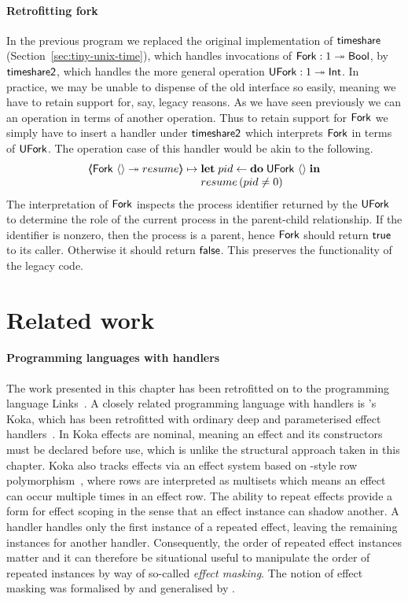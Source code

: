 \documentclass[12pt,phd,lfcs,twoside,openright,logo,leftchapter,normalheadings]{infthesis}
\theoremstyle{plain}
\theoremstyle{definition}
\begin{document}
\paragraph{Retrofitting fork} In the previous program we replaced the
original implementation of $\mathsf{timeshare}$
(Section~\ref{sec:tiny-unix-time}), which handles invocations of
$\mathsf{Fork} : 1 \twoheadrightarrow \mathsf{Bool}$, by $\mathsf{timeshare2}$, which handles the
more general operation $\mathsf{UFork} : 1 \twoheadrightarrow \mathsf{Int}$. In practice,
we may be unable to dispense of the old interface so easily, meaning
we have to retain support for, say, legacy reasons. As we have seen
previously we can an operation in terms of another operation. Thus to
retain support for $\mathsf{Fork}$ we simply have to insert a handler under
$\mathsf{timeshare2}$ which interprets $\mathsf{Fork}$ in terms of $\mathsf{UFork}$. The
operation case of this handler would be akin to the following.
%
\[
  \OpCase{\Fork}{\Unit}{resume} \mapsto
    \bl
      \Let\;pid \revto \Do\;\UFork~\Unit\;\In\\
      resume\,(pid \neq 0)
    \el
\]
%
The interpretation of $\mathsf{Fork}$ inspects the process identifier returned
by the $\mathsf{UFork}$ to determine the role of the current process in the
parent-child relationship. If the identifier is nonzero, then the
process is a parent, hence $\mathsf{Fork}$ should return $\mathsf{true}$ to its
caller. Otherwise it should return $\mathsf{false}$. This preserves the
functionality of the legacy code.

\section{Related work}
\label{sec:unix-related-work}

\paragraph{Programming languages with handlers} The work presented in
this chapter has been retrofitted on to the programming language
Links~\cite{HillerstromL16,HillerstromL18}. A closely related
programming language with handlers is \citeauthor{Leijen17}'s Koka,
which has been retrofitted with ordinary deep and parameterised effect
handlers~\cite{Leijen17}. In Koka effects are nominal, meaning an
effect and its constructors must be declared before use, which is
unlike the structural approach taken in this chapter. Koka also tracks
effects via an effect system based on \citeauthor{Leijen05}-style row
polymorphism~\cite{Leijen05,Leijen14}, where rows are interpreted as
multisets which means an effect can occur multiple times in an effect
row. The ability to repeat effects provide a form for effect scoping
in the sense that an effect instance can shadow another. A handler
handles only the first instance of a repeated effect, leaving the
remaining instances for another handler. Consequently, the order of
repeated effect instances matter and it can therefore be situational
useful to manipulate the order of repeated instances by way of
so-called \emph{effect masking}.
%
The notion of effect masking was formalised by \citet{BiernackiPPS18}
and generalised by \citet{ConventLMM20}.
%
\end{document}
